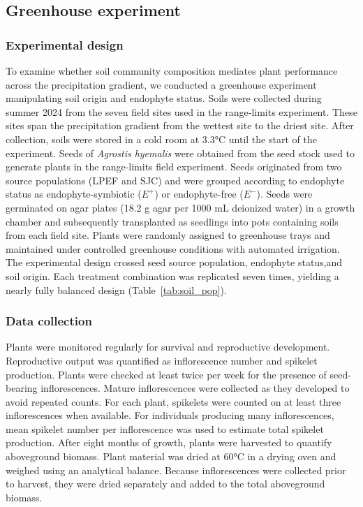 \documentclass[12pt]{article}\usepackage[]{graphicx}\usepackage[dvipsnames]{xcolor}
\begin{document}
{\subsection*{Greenhouse experiment}

\subsubsection*{Experimental design}

To examine whether soil community composition mediates plant performance across the precipitation gradient, we conducted a greenhouse experiment
manipulating soil origin and endophyte status.
Soils were collected during summer 2024 from the seven field sites used in the range‐limits experiment.
These sites span the precipitation gradient from the wettest site to the driest site. 
After collection, soils were stored in a cold room at 3.3°C until the start of the experiment.
Seeds of \textit{Agrostis hyemalis} were obtained from the seed stock used to generate plants in the range-limits field experiment. 
Seeds originated from two source populations (LPEF and SJC) and were grouped according to endophyte status as endophyte-symbiotic ($E^{+}$) or endophyte-free ($E^{-}$).
Seeds were germinated on agar plates (18.2 g agar per 1000 mL deionized water) in a growth chamber and subsequently transplanted as seedlings
into pots containing soils from each field site. Plants were randomly assigned to greenhouse trays and maintained under controlled greenhouse
conditions with automated irrigation.
The experimental design crossed seed source population, endophyte status,and soil origin. Each treatment combination was replicated seven times,
yielding a nearly fully balanced design (Table~\ref{tab:soil_pop}).

\subsubsection*{Data collection}

Plants were monitored regularly for survival and reproductive development. 
Reproductive output was quantified as inflorescence number and spikelet production. Plants were checked at least twice per week for the presence of seed-bearing inflorescences. 
Mature inflorescences were collected as they developed to avoid repeated counts. For each plant, spikelets were counted on at least three inflorescences when available.
For individuals producing many inflorescences, mean spikelet number per inflorescence was used to estimate total spikelet production.
After eight months of growth, plants were harvested to quantify aboveground biomass. Plant material was dried at 60°C in a drying oven and weighed using an analytical balance. 
Because inflorescences were collected prior to harvest, they were dried separately and added to the total aboveground biomass.


}
\end{document}

